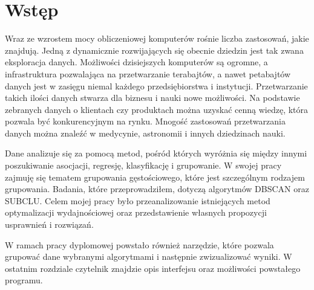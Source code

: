 \chapter{Wstęp}
Wraz ze wzrostem mocy obliczeniowej komputerów rośnie liczba zastosowań, jakie znajdują. Jedną z dynamicznie rozwijających się obecnie dziedzin jest tak zwana eksploracja danych. Możliwości dzisiejszych komputerów są ogromne, a infrastruktura pozwalająca na przetwarzanie terabajtów, a nawet petabajtów danych jest w zasięgu niemal każdego przedsiębiorstwa i instytucji. Przetwarzanie takich ilości danych stwarza dla biznesu i nauki nowe możliwości. Na podstawie zebranych danych o klientach czy produktach można uzyskać cenną wiedzę, która pozwala być konkurencyjnym na rynku. Mnogość zastosowań przetwarzania danych można znaleźć w medycynie, astronomii i innych dziedzinach nauki. \par
Dane analizuje się za pomocą metod, pośród których wyróżnia się między innymi poszukiwanie asocjacji, regresję, klasyfikację i grupowanie. W swojej pracy zajmuję się tematem grupowania gęstościowego, które jest szczególnym rodzajem grupowania. Badania, które przeprowadziłem, dotyczą algorytmów DBSCAN oraz SUBCLU. Celem mojej pracy było przeanalizowanie istniejących metod optymalizacji wydajnościowej oraz przedstawienie własnych propozycji usprawnień i rozwiązań. \par
W ramach pracy dyplomowej powstało również narzędzie, które pozwala grupować dane wybranymi algorytmami i następnie zwizualizować wyniki. W ostatnim rozdziale czytelnik znajdzie opis interfejsu oraz możliwości powstałego programu.